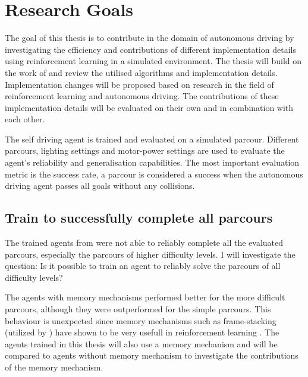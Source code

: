 


\chapter{Research Goals}
\label{cha:Research Goals}

The goal of this thesis is to contribute in the domain of autonomous driving by investigating the efficiency and contributions of different implementation details using reinforcement learning in a simulated environment. The thesis will build on the work of \autocite{maximilian} and review the utilised algorithms and implementation details. Implementation changes will be proposed based on research in the field of reinforcement learning and autonomous driving. The contributions of these implementation details will be evaluated on their own and in combination with each other. 


The self driving agent is trained and evaluated on a simulated parcour. Different parcours, lighting settings and motor-power settings are used to evaluate the agent's reliability and generalisation capabilities. The most important evaluation metric is the success rate, a parcour is considered a success when the autonomous driving agent passes all goals without any collisions.

\section*{Train to successfully complete all parcours}

The trained agents from \autocite{maximilian} were not able to reliably complete all the evaluated parcours, especially the parcours of higher difficulty levels. I will investigate the question: Is it possible to train an agent to reliably solve the parcours of all difficulty levels?

The agents with memory mechanisms performed better for the more difficult parcours, although they were outperformed for the simple parcours. This behaviour is unexpected since memory mechanisms such as frame-stacking (utilized by \autocite{maximilian}) have shown to be very usefull in reinforcement learning \autocite{human_level_control}. The agents trained in this thesis will also use a memory mechanism and will be compared to agents without memory mechanism to investigate the contributions of the memory mechanism.


